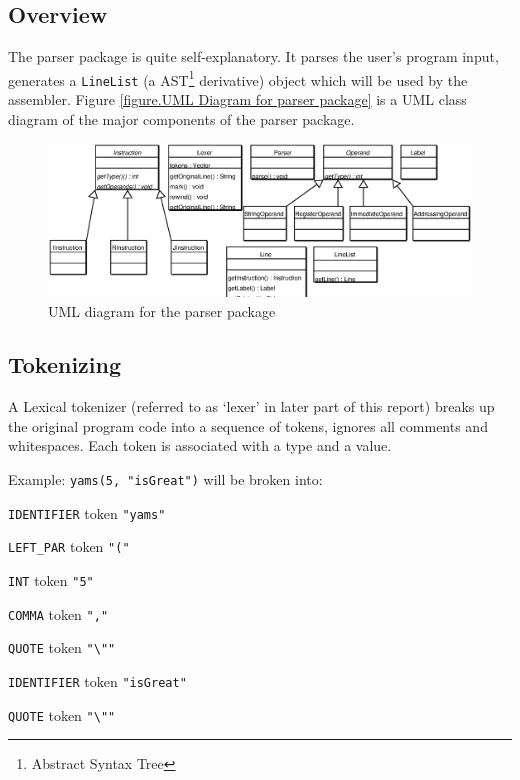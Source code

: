 \subsection{Overview}

The parser package is quite self-explanatory. It parses the user's
program input, generates a \texttt{LineList} (a
AST\footnote{Abstract Syntax Tree} derivative) object which will
be used by the assembler. Figure \ref{figure.UML Diagram for
parser package} is a UML class diagram of the major components of
the parser package.

\begin{figure}[h]

\includegraphics[scale=0.5]{parseruml.eps}

\caption{UML diagram for the parser package} \label{figure.UML
Diagram for parser package}

\end{figure}


\subsection{Tokenizing}

A Lexical tokenizer (referred to as `lexer' in later part
of this report) breaks up the original program code into a
sequence of tokens, ignores all comments and whitespaces. Each
token is associated with a type and a value.

Example: \texttt{yams(5, "isGreat")} will be broken into:

\texttt{IDENTIFIER} token \texttt{"yams"}

\texttt{LEFT\_PAR} token \texttt{"("}

\texttt{INT} token \texttt{"5"}

\texttt{COMMA} token \texttt{","}

\texttt{QUOTE} token \texttt{"\textbackslash ""}

\texttt{IDENTIFIER} token \texttt{"isGreat"}

\texttt{QUOTE} token \texttt{"\textbackslash ""}

